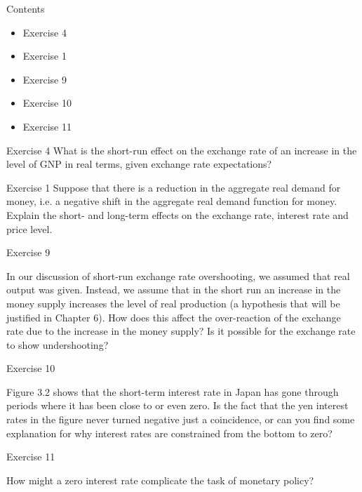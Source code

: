 \begin{frame}{Contents}
\protect\hypertarget{in-queste-diapositive}{}

\begin{itemize}
\item
  Exercise 4
\item
  Exercise 1
\item
  Exercise 9
\item
  Exercise 10
\item
  Exercise 11
\end{itemize}

\end{frame}

\begin{frame}{Exercise 4}
What is the short-run effect on the exchange rate of an increase in the level of GNP in real terms, given exchange rate expectations?
\end{frame}

\begin{frame}{Exercise 1}
Suppose that there is a reduction in the aggregate real demand for money, i.e. a negative shift in the aggregate real demand function for money. Explain the short- and long-term effects on the exchange rate, interest rate and price level.
\end{frame}

\begin{frame}{Exercise 9}

In our discussion of short-run exchange rate overshooting, we assumed that real output was given. Instead, we assume that in the short run an increase in the money supply increases the level of real production (a hypothesis that will be justified in Chapter 6). How does this affect the over-reaction of the exchange rate due to the increase in the money supply? Is it possible for the exchange rate to show undershooting?
\end{frame}

\begin{frame}{Exercise 10}

Figure 3.2 shows that the short-term interest rate in Japan has gone through periods where it has been close to or even zero. Is the fact that the yen interest rates in the figure never turned negative just a coincidence, or can you find some explanation for why interest rates are constrained from the bottom to zero?
\end{frame}

\begin{frame}{Exercise 11}

How might a zero interest rate complicate the task of monetary policy?
\end{frame}

